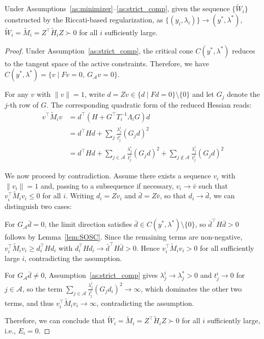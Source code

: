 \documentclass[class=scrbook, crop=false]{standalone}
\begin{document}
\begin{proposition}
    \label{prop:vanish}
    Under Assumptions~\ref{as:minimizer}--\ref{as:strict_comp}, given the sequence $\{\tilde{W}_i\}$ constructed by the Riccati-based regularization, as $\{(y_i, \lambda_i)\} \to (y^*, \lambda^*)$,
    $\tilde{W}_i = \tilde{M}_i = Z^\top \tilde{H}_i Z \succ 0$ for all $i$ sufficiently large.
\end{proposition}

\begin{proof}
    Under Assumption~\ref{as:strict_comp}, the critical cone $C(y^*,\lambda^*)$ reduces to the tangent space of the active constraints. 
    Therefore, we have $C(y^*,\lambda^*) = \{v \mid F v = 0,\ G_{\mathcal{A}} v = 0\}$.

    For any $v$ with $\|v\| = 1$, write $d = Zv \in \{d \mid Fd = 0\} \setminus \{0\}$
    and let $G_j$ denote the $j$-th row of $G$.
    The corresponding quadratic form of the reduced Hessian reads:
    \begin{align*}
        v^\top \tilde{M}_i v &= d^\top (H + G^\top T_i^{-1} \Lambda_i  G) d \\
                             &= d^\top H d + \sum_{j} \frac{\lambda_j^i}{t_j^i} (G_j d)^2 \\
                             &= d^\top H d + \sum_{j \in \mathcal{A}} \frac{\lambda_j^i}{t_j^i} (G_j d)^2 + \sum_{j \notin \mathcal{A}} \frac{\lambda_j^i}{t_j^i} (G_j d)^2
    \end{align*}

    We now proceed by contradiction. Assume there exists a sequence $v_i$ with $\|v_i\| = 1$ and, passing to a subsequence if necessary, $v_i \to \bar{v}$
    such that $v_i^\top \tilde{M}_i v_i \leq 0$ for all $i$.
    Writing $d_i = Z v_i$ and $\bar{d} = Z \bar{v}$, so that $d_i \to \bar{d}$, we can distinguish two cases:

    For $G_{\mathcal{A}}\bar{d}=0$, the limit direction satisfies $\bar{d} \in C(y^*,\lambda^*) \setminus \{0\}$,
    so $\bar{d}^\top H \bar{d} > 0$ follows by Lemma~\ref{lem:SOSC}.
    Since the remaining terms are non-negative, $v_i^\top \tilde{M}_i v_i \ge d_i^\top H d_i$ 
    with $d_i^\top H d_i \to \bar{d}^\top H \bar{d} > 0$.
    Hence $v_i^\top \tilde{M}_i v_i > 0$ for all sufficiently large $i$, contradicting the assumption.

    For $G_{\mathcal{A}}\bar{d} \neq 0$, Assumption~\ref{as:strict_comp} gives $\lambda_j^i \to \lambda_j^* > 0$ and $t_j^i \to 0$ for $j \in \mathcal{A}$,
    so the term $\sum_{j \in \mathcal{A}} \frac{\lambda_j^i}{t_j^i} (G_j d_i)^2 \rightarrow \infty$, 
    which dominates the other two terms, and thus $v_i^\top \tilde{M}_i v_i \rightarrow \infty$, contradicting the assumption.

    Therefore, we can conclude that $\tilde{W}_i = \tilde{M}_i = Z^\top \tilde{H}_i Z \succ 0$ for all $i$ sufficiently large, i.e., $E_i=0$.
\end{proof}
\end{document}
